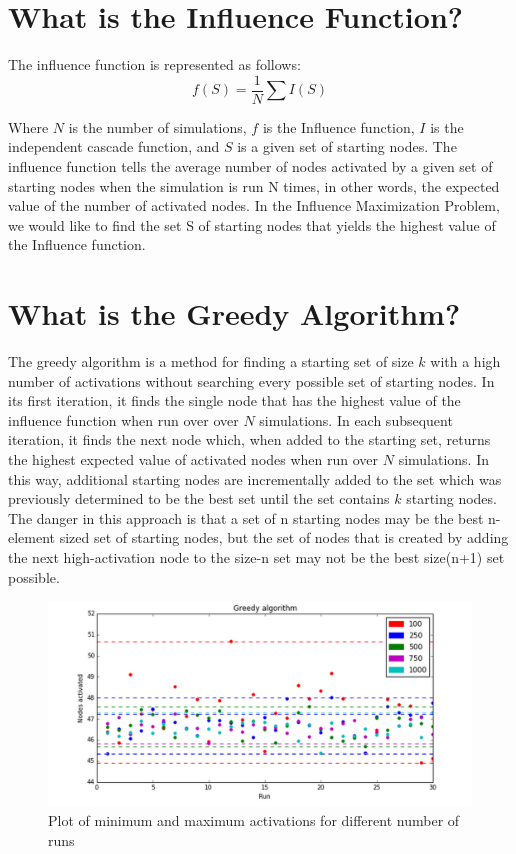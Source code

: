 \documentclass[11pt]{scrartcl} %
\begin{document}
\section{What is the Influence Function?}

The influence function is represented as follows:
\begin{equation}
f(S) = \frac{1}{N} \sum I(S)
\end{equation}

Where $N$ is the number of simulations, $f$ is the Influence function, $I$ is the independent cascade function, and $S$ is a given set of starting nodes.  The influence function tells the average number of nodes activated by a given set of starting nodes when the simulation is run N times, in other words, the expected value of the number of activated nodes.  In the Influence Maximization Problem, we would like to find the set S of starting nodes that yields the highest value of the Influence function.    


\section{What is the Greedy Algorithm?}

The greedy algorithm is a method for finding a starting set of size $k$ with a high number of activations without searching every possible set of starting nodes.  In its first iteration, it finds the single node that has the highest value of the influence function when run over over $N$ simulations.  In each subsequent iteration, it finds the next node which, when added to the starting set, returns the highest expected value of activated nodes when run over $N$ simulations.  In this way, additional starting nodes are incrementally added to the set which was previously determined to be the best set until the set contains $k$ starting nodes.\\ 
	
The danger in this approach is that a set of n starting nodes may be the best n-element sized set of starting nodes, but the set of nodes that is created by adding the next high-activation node to the size-n set may not be the best size(n+1) set possible.  

\begin{figure}[h!]
\centering
\includegraphics[width=15 cm]{greedy_min}
\caption{Plot of minimum and maximum activations for different number of runs}
\label{fig:GA}
\end{figure}
\end{document}
